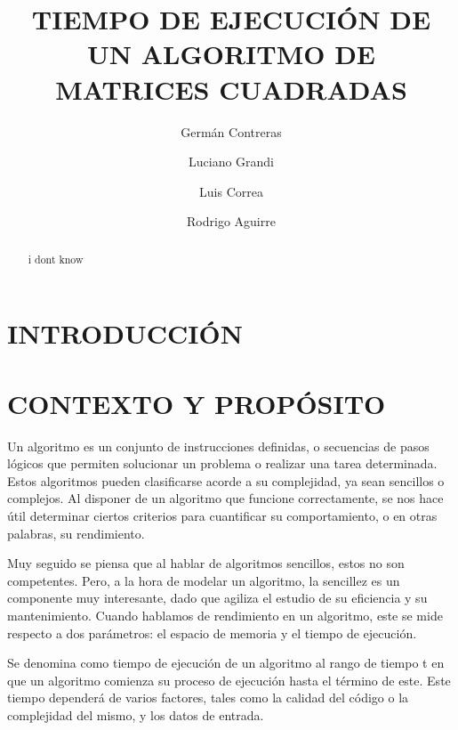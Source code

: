 \documentclass[11pt, twocolumn]{llncs}
\begin{document}
\title{TIEMPO DE EJECUCIÓN DE UN ALGORITMO DE MATRICES CUADRADAS}
\author{
Germán Contreras  \and 
Luciano Grandi  \and
Luis Correa \and 
Rodrigo Aguirre  \\ 
}
\maketitle

\begin{abstract}
i dont know
\end{abstract}

\section{INTRODUCCIÓN}


\section{CONTEXTO Y PROPÓSITO}\label{contexto_proposito}

Un algoritmo es un conjunto de instrucciones definidas, o secuencias de pasos lógicos que permiten solucionar un problema o realizar una tarea determinada. Estos algoritmos pueden clasificarse acorde a su complejidad, ya sean sencillos o complejos. Al disponer de un algoritmo que funcione correctamente, se nos hace útil determinar ciertos criterios para cuantificar su comportamiento, o en otras palabras, su rendimiento.

Muy seguido se piensa que al hablar de algoritmos sencillos, estos no son competentes. Pero, a la hora de modelar un algoritmo, la sencillez es un componente muy interesante, dado que agiliza el estudio de su eficiencia y su mantenimiento. Cuando hablamos de rendimiento en un algoritmo, este se mide respecto a dos parámetros: el espacio de memoria y el tiempo de ejecución.

Se denomina como tiempo de ejecución de un algoritmo al rango de tiempo t en que un algoritmo comienza su proceso de ejecución hasta el término de este. Este tiempo dependerá de varios factores, tales como la calidad del código o la complejidad del mismo, y los datos de entrada.
\end{document}
